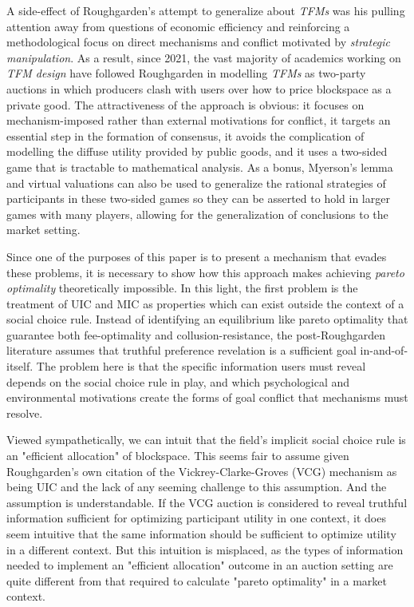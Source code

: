 A side-effect of Roughgarden's attempt to generalize about \textit{TFMs} was his pulling attention away from questions of economic efficiency and reinforcing a methodological focus on direct mechanisms and conflict motivated by \textit{strategic manipulation}. As a result, since 2021, the vast majority of academics working on \textit{TFM design} have followed Roughgarden in modelling \textit{TFMs} as two-party auctions in which producers clash with users over how to price blockspace as a private good. The attractiveness of the approach is obvious: it focuses on mechanism-imposed rather than external motivations for conflict, it targets an essential step in the formation of consensus, it avoids the complication of modelling the diffuse utility provided by public goods, and it uses a two-sided game that is tractable to mathematical analysis. As a bonus, Myerson's lemma and virtual valuations can also be used to generalize the rational strategies of participants in these two-sided games so they can be asserted to hold in larger games with many players, allowing for the generalization of conclusions to the market setting.

Since one of the purposes of this paper is to present a mechanism that evades these problems, it is necessary to show how this approach makes achieving \textit{pareto optimality} theoretically impossible. In this light, the first problem is the treatment of UIC and MIC as properties which can exist outside the context of a social choice rule. Instead of identifying an equilibrium like pareto optimality that guarantee both fee-optimality and collusion-resistance, the post-Roughgarden literature assumes that truthful preference revelation is a sufficient goal in-and-of-itself. The problem here is that the specific information users must reveal depends on the social choice rule in play, and which psychological and environmental motivations create the forms of goal conflict that mechanisms must resolve.

Viewed sympathetically, we can intuit that the field's implicit social choice rule is an "efficient allocation" of blockspace. This seems fair to assume given Roughgarden's own citation of the Vickrey-Clarke-Groves (VCG) mechanism as being UIC and the lack of any seeming challenge to this assumption. And the assumption is understandable. If the VCG auction is considered to reveal truthful information sufficient for optimizing participant utility in one context, it does seem intuitive that the same information should be sufficient to optimize utility in a different context. But this intuition is misplaced, as the types of information needed to implement an "efficient allocation" outcome in an auction setting are quite different from that required to calculate "pareto optimality" in a market context.

